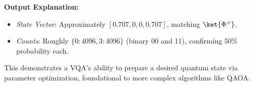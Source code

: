 \textbf{Output Explanation:}
\begin{itemize}
  \item \textit{State Vector}: Approximately $[0.707, 0, 0, 0.707]$, matching
    $\ket{\Phi^+}$.

  \item \textit{Counts}: Roughly $\{0: 4096, 3: 4096\}$ (binary 00 and 11),
    confirming 50\% probability each.
\end{itemize}

This demonstrates a VQA’s ability to prepare a desired quantum state via
parameter optimization, foundational to more complex algorithms like QAOA.

